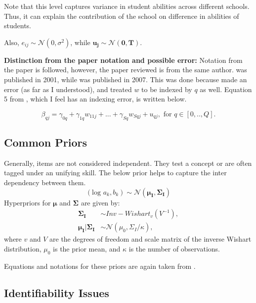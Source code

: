 \documentclass[12pt]{article}
\begin{document}
Note that this level captures variance in student abilities across different schools. Thus, it can explain the contribution of the school on difference in abilities of students.

Also, $e_{ij} \sim \mathcal{N}(0, \sigma^2)$, while $\boldsymbol{u_j} \sim \mathcal{N}(\boldsymbol{0}, \boldsymbol{T})$.

\textbf{Distinction from the paper notation and possible error:}
Notation from the paper \cite{fox2007multilevel} is followed, however, the paper reviewed is \cite{fox2001bayesian} from the same author. \cite{fox2001bayesian} was published in 2001, while \cite{fox2007multilevel} was published in 2007. This was done because \cite{fox2001bayesian} made an error (as far as I understood), and treated $w$ to be indexed by $q$ as well. Equation 5 from \cite{fox2001bayesian}, which I feel has an indexing error, is written below.

\begin{equation*}
    \beta_{qj} = \gamma_{0q} + \gamma_{1q}w_{11j} + ... + \gamma_{Sq}w_{Sqj} + u_{qj}, \text{ for } q\in [0,.., Q].
\end{equation*}

\subsection{Common Priors}
Generally, items are not considered independent. They test a concept or are often tagged under an unifying skill. The below prior helps to capture the inter dependency between them.
\begin{equation*}
    (\text{log }a_k, b_k) \sim \mathcal{N}(\boldsymbol{\mu_I}, \boldsymbol{\Sigma_I})
\end{equation*}
Hyperpriors for $\boldsymbol{\mu}$ and $\boldsymbol{\Sigma}$ are given by:
\begin{align*}
    \boldsymbol{\Sigma_I} & \sim Inv-Wishart_v(V^{-1}),\\
    \boldsymbol{\mu_I}|\boldsymbol{\Sigma_I} & \sim \mathcal{N}(\mu_0, \Sigma_I/\kappa),
\end{align*}
where $v$ and $V$ are the degrees of freedom and scale matrix of the inverse Wishart distribution, $\mu_0$ is the prior mean, and $\kappa$ is the number of observations.

Equations and notations for these priors are again taken from \cite{fox2007multilevel}.

\subsection{Identifiability Issues}
\end{document}
